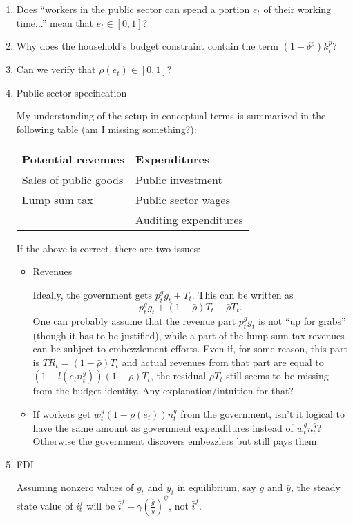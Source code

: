 \documentclass[]{scrartcl}
\begin{document}
\begin{enumerate}
\item Does ``workers in the public sector can spend a portion $ e_t $ of their working time...'' mean that $e_t \in [0,1]$?
\item Why does the household's budget constraint contain the term $ (1-\delta^p)k^p_t $?
\item Can we verify that $ \rho(e_t) \in [0,1] $?
\item Public sector specification

My understanding of the setup in conceptual terms is summarized in the following table (am I missing something?):

\begin{tabular}{l|l}
\hline
Potential revenues & Expenditures \\ \hline
Sales of public goods & Public investment \\
Lump sum tax & Public sector wages \\
{} & Auditing expenditures
\end{tabular}

If the above is correct, there are two issues:
\begin{itemize}
\item Revenues

Ideally, the government gets $ p^g_t g_t + T_t $. This can be written as \[  p^g_t g_t + (1-\bar{\rho}) T_t + \bar{\rho} T_t. \] One can probably assume that the revenue part $p^g_t g_t$ is not ``up for grabs'' (though it has to be justified), while a part of the lump sum tax revenues can be subject to embezzlement efforts. Even if, for some reason, this part is $ TR_t = (1-\bar{\rho}) T_t $ and actual revenues from that part are equal to $ (1-l(e_t n_t^g))(1-\bar{\rho}) T_t $, the residual $ \bar{\rho} T_t $ still seems to be missing from the budget identity. Any explanation/intuition for that?
\item If workers get $ w^g_t (1-\rho(e_t))n^g_t $ from the government, isn't it logical to have the same amount as government expenditures instead of $ w_t^g n_t^g $? Otherwise the government discovers embezzlers but still pays them.
\end{itemize}
\item FDI

Assuming nonzero values of $ g_t $ and $ y_t $ in equilibrium, say $ \bar{g} $ and $ \bar{y} $, the steady state value of $ i^f_t $ will be $ \bar{i}^f + \gamma \left(\frac{\bar{g}}{\bar{y}}\right)^{\psi} $, not $ \bar{i}^f $.
\end{enumerate}
\end{document}
